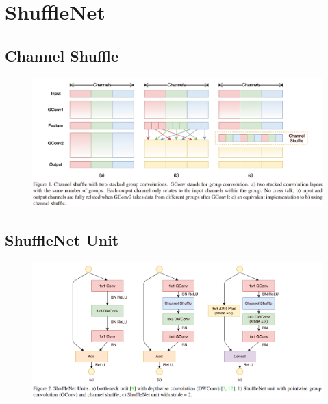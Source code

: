 \section{ShuffleNet}
\subsection{Channel Shuffle}
\begin{figure}[H]
    \centering
    \includegraphics[width=16cm]{images/models/channel_shuffle.png}
    \label{fig:channel_shuffle}
\end{figure}

\subsection{ShuffleNet Unit}
\begin{figure}[H]
    \centering
    \includegraphics[width=16cm]{images/models/shufflenet_unit.png}
    \label{fig:shufflenet_unit}
\end{figure}

